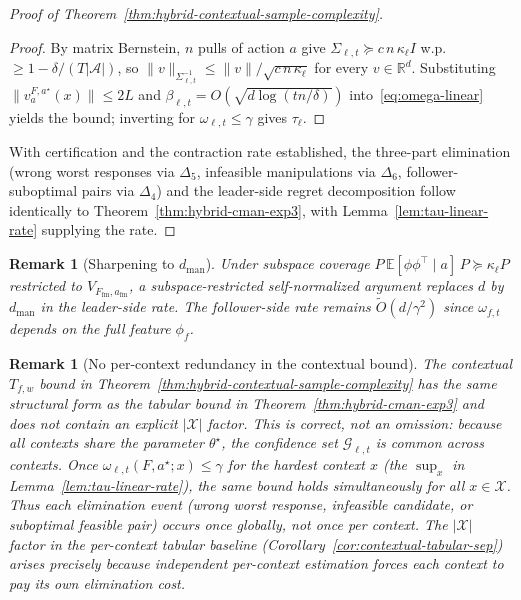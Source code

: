 \documentclass{article}
\newcommand{\cA}{\mathcal{A}}
\newcommand{\cX}{\mathcal{X}}
\newcommand{\cG}{\mathcal{G}}
\newcommand{\R}{\mathbb{R}}
\newcommand{\E}{\mathbb{E}}           %
\newtheorem{remark}[theorem]{Remark}
\begin{document}
\begin{proof}[Proof of Theorem~\ref{thm:hybrid-contextual-sample-complexity}]
\begin{proof}
By matrix Bernstein, $n$ pulls of action $a$ give $\Sigma_{\ell,t}\succeq c\,n\,\kappa_\ell I$ w.p.\ $\ge 1-\delta/(T|\cA|)$, so $\|v\|_{\Sigma_{\ell,t}^{-1}}\le\|v\|/\sqrt{c\,n\,\kappa_\ell}$ for every $v\in\R^d$. Substituting $\|v_a^{F,a^\star}(x)\|\le 2L$ and $\beta_{\ell,t}=O(\sqrt{d\log(tn/\delta)})$ into~\eqref{eq:omega-linear} yields the bound; inverting for $\omega_{\ell,t}\le\gamma$ gives $\tau_\ell$.
\end{proof}

With certification and the contraction rate established, the three-part elimination (wrong worst responses via $\Delta_5$, infeasible manipulations via $\Delta_6$, follower-suboptimal pairs via $\Delta_4$) and the leader-side regret decomposition follow identically to Theorem~\ref{thm:hybrid-cman-exp3}, with Lemma~\ref{lem:tau-linear-rate} supplying the rate.
\end{proof}

\begin{remark}[Sharpening to $d_{\mathrm{man}}$]
\label{rem:dman-sharpening}
Under subspace coverage $P\,\E[\phi\phi^\top\mid a]\,P\succeq\kappa_\ell P$ restricted to $V_{F_{\mathrm{fm}},a_{\mathrm{fm}}}$, a subspace-restricted self-normalized argument replaces $d$ by $d_{\mathrm{man}}$ in the leader-side rate. The follower-side rate remains $\widetilde O(d/\gamma^2)$ since $\omega_{f,t}$ depends on the full feature $\phi_f$.
\end{remark}

\begin{remark}[No per-context redundancy in the contextual bound]
\label{rem:no-double-counting}
The contextual $T_{f,w}$ bound in Theorem~\ref{thm:hybrid-contextual-sample-complexity} has the same structural form as the tabular bound in Theorem~\ref{thm:hybrid-cman-exp3} and does not contain an explicit $|\cX|$ factor. This is correct, not an omission: because all contexts share the parameter $\theta^\star$, the confidence set $\cG_{\ell,t}$ is common across contexts. Once $\omega_{\ell,t}(F,a^\star;x)\le\gamma$ for the hardest context $x$ (the $\sup_x$ in Lemma~\ref{lem:tau-linear-rate}), the same bound holds simultaneously for all $x\in\cX$. Thus each elimination event (wrong worst response, infeasible candidate, or suboptimal feasible pair) occurs once globally, not once per context. The $|\cX|$ factor in the per-context tabular baseline (Corollary~\ref{cor:contextual-tabular-sep}) arises precisely because independent per-context estimation forces each context to pay its own elimination cost.
\end{remark}
\end{document}
